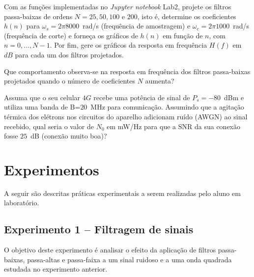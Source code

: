 \documentclass[12pt,addpoints]{exam}
\begin{document}
\begin{questions}

\question Com as funções implementadas no \textit{Jupyter notebook} Lab2, projete os filtros passa-baixas de ordens $N = 25,50,100\text{ e }200$, isto é, determine os coeficientes $h(n)$ para $\omega_s = 2\pi 8000$~rad/s (frequência de amostragem) e $\omega_c = 2\pi 1000$~rad/s (frequência de corte) e forneça os gráficos de $h(n)$ em função de $n$, com $n=0,...,N-1$. Por fim, gere os gráficos da resposta em frequência $H(f)$ em $dB$ para cada um dos filtros projetados. 

\question Que comportamento observa-se na resposta em frequência dos filtros passa-baixas projetados quando o número de coeficientes $N$ aumenta?

\question Assuma que o seu celular $4G$ recebe uma potência de sinal de $P_s=-80$~dBm e utiliza uma banda de B=$20$~MHz para comunicação. Assumindo que a agitação térmica dos elétrons nos circuitos do aparelho adicionam ruído (AWGN) ao sinal recebido, qual seria o valor de $N_0$ em mW/Hz para que a $\mathrm{SNR}$ da sua conexão fosse $25$~dB (conexão muito boa)?

\end{questions}

\section{Experimentos}

A seguir são descritas práticas experimentais a serem realizadas pelo aluno em laboratório. 

\subsection{Experimento 1 -- Filtragem de sinais}

O objetivo deste experimento é analisar o efeito da aplicação de filtros passa-baixas, passa-altas e passa-faixa a um sinal ruidoso e a uma onda quadrada estudada no experimento anterior.
\end{document}
